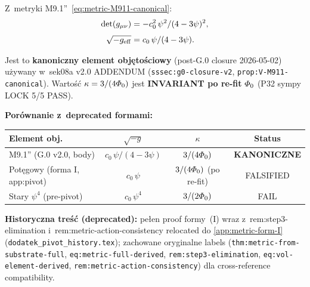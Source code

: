 \begin{remark}%
\label{rem:vol-element-M911}
Z~metryki M9.1''~\eqref{eq:metric-M911-canonical}:
\begin{align}
  \det(g_{\mu\nu})
  &= -c_0^2\,\psi^2/(4-3\psi)^2, \nonumber\\[4pt]
  \sqrt{-g_{\rm eff}}
  &= c_0\,\psi/(4-3\psi).
  \label{eq:vol-element-M911}
\end{align}

Jest to \textbf{kanoniczny element obj\k{e}to\'sciowy} (post-G.0
closure 2026-05-02) u\.zywany w~sek08a v2.0 ADDENDUM
(\texttt{sssec:g0-closure-v2}, \texttt{prop:V-M911-canonical}).
Warto\'s\'c $\kappa = 3/(4\varPhi_0)$ jest \textbf{INVARIANT po re-fit}
$\varPhi_0$ (P32 sympy LOCK 5/5 PASS).

\medskip\noindent
\textbf{Por\'ownanie z~deprecated formami:}
\begin{center}
\renewcommand{\arraystretch}{1.3}
\begin{tabular}{l|c|c|c}
\toprule
Element obj. & $\sqrt{-g}$ & $\kappa$ & Status \\
\midrule
M9.1'' (G.0 v2.0, body) & $c_0\,\psi/(4-3\psi)$ & $3/(4\varPhi_0)$ & \textbf{KANONICZNE} \\
Pot\k{e}gowy (forma I, app:pivot) & $c_0\,\psi$ & $3/(4\varPhi_0)$ (po re-fit) & FALSIFIED \\
Stary $\psi^4$ (pre-pivot) & $c_0\,\psi^4$ & $3/(2\varPhi_0)$ & FAIL \\
\bottomrule
\end{tabular}
\end{center}

\textbf{Historyczna treść (deprecated):} pe\l{}en proof formy~(I) wraz
z~rem:step3-elimination i~rem:metric-action-consistency relocated do
\ref{app:metric-form-I} (\texttt{dodatek\_pivot\_history.tex}); zachowane
oryginalne labels (\texttt{thm:metric-from-substrate-full},
\texttt{eq:metric-full-derived}, \texttt{rem:step3-elimination},
\texttt{eq:vol-element-derived}, \texttt{rem:metric-action-consistency})
dla cross-reference compatibility.
\end{remark}


